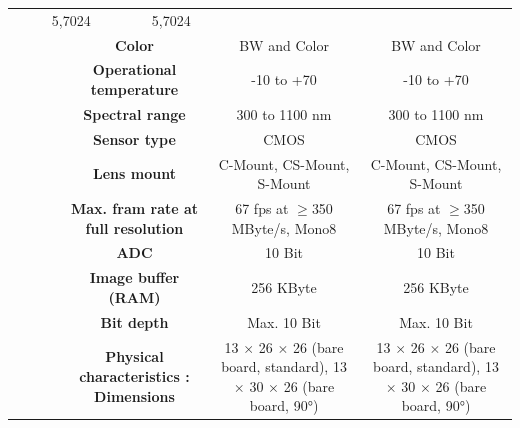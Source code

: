 \begin{table}[H]
{\begin{tabular}{ccc|cc|cc|}
  \multicolumn{2}{c|}{5,7024} &
  \multicolumn{2}{c|}{5,7024} \\
\multicolumn{1}{|c|}{} &
  \multicolumn{2}{c|}{\cellcolor[HTML]{EFEFEF}\textbf{Color}} &
  \multicolumn{2}{c|}{\cellcolor[HTML]{EFEFEF}BW and Color} &
  \multicolumn{2}{c|}{\cellcolor[HTML]{EFEFEF}BW and Color} \\
\multicolumn{1}{|c|}{} &
  \multicolumn{2}{c|}{\textbf{Operational temperature}} &
  \multicolumn{2}{c|}{-10 to +70} &
  \multicolumn{2}{c|}{-10 to +70} \\
\multicolumn{1}{|c|}{} &
  \multicolumn{2}{c|}{\cellcolor[HTML]{EFEFEF}\textbf{Spectral range}} &
  \multicolumn{2}{c|}{\cellcolor[HTML]{EFEFEF}300 to 1100 nm} &
  \multicolumn{2}{c|}{\cellcolor[HTML]{EFEFEF}300 to 1100 nm} \\
\multicolumn{1}{|c|}{} &
  \multicolumn{2}{c|}{\textbf{Sensor type}} &
  \multicolumn{2}{c|}{CMOS} &
  \multicolumn{2}{c|}{CMOS} \\
\multicolumn{1}{|c|}{} &
  \multicolumn{2}{c|}{\cellcolor[HTML]{EFEFEF}\textbf{Lens mount}} &
  \multicolumn{2}{c|}{\cellcolor[HTML]{EFEFEF}C-Mount, CS-Mount, S-Mount} &
  \multicolumn{2}{c|}{\cellcolor[HTML]{EFEFEF}C-Mount, CS-Mount, S-Mount} \\
\multicolumn{1}{|c|}{} &
  \multicolumn{2}{c|}{\textbf{Max. fram rate at full resolution}} &
  \multicolumn{2}{c|}{67 fps at $\geq$350 MByte/s, Mono8} &
  \multicolumn{2}{c|}{67 fps at $\geq$350 MByte/s, Mono8} \\
\multicolumn{1}{|c|}{} &
  \multicolumn{2}{c|}{\cellcolor[HTML]{EFEFEF}\textbf{ADC}} &
  \multicolumn{2}{c|}{\cellcolor[HTML]{EFEFEF}10 Bit} &
  \multicolumn{2}{c|}{\cellcolor[HTML]{EFEFEF}10 Bit} \\
\multicolumn{1}{|c|}{} &
  \multicolumn{2}{c|}{\textbf{Image buffer (RAM)}} &
  \multicolumn{2}{c|}{256 KByte} &
  \multicolumn{2}{c|}{256 KByte} \\
\multicolumn{1}{|c|}{} &
  \multicolumn{2}{c|}{\cellcolor[HTML]{EFEFEF}\textbf{Bit depth}} &
  \multicolumn{2}{c|}{\cellcolor[HTML]{EFEFEF}Max. 10 Bit} &
  \multicolumn{2}{c|}{\cellcolor[HTML]{EFEFEF}Max. 10 Bit} \\
\multicolumn{1}{|c|}{} &
  \multicolumn{2}{c|}{\textbf{Physical characteristics : Dimensions}} &
  \multicolumn{2}{c|}{13 $\times$ 26 $\times$ 26 (bare board, standard), 13 $\times$ 30 $\times$ 26 (bare board, 90°)} &
  \multicolumn{2}{c|}{13 $\times$ 26 $\times$ 26 (bare board, standard), 13 $\times$ 30 $\times$ 26 (bare board, 90°)} \\

\end{tabular}}
\end{table}
